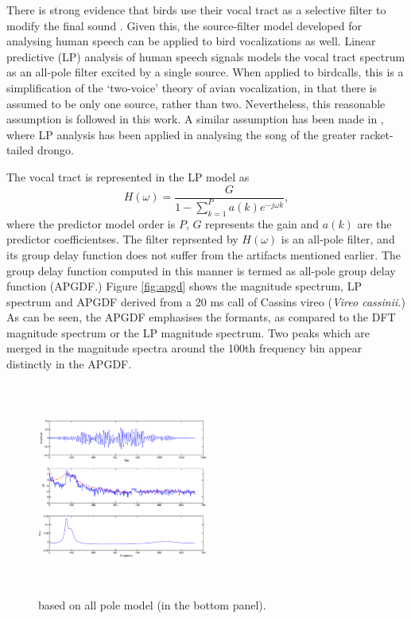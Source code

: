 \documentclass[a4paper]{article}
\begin{document}
There is strong evidence that birds use their vocal tract as a selective filter
to modify the final sound \cite{catchpole}.  Given this, the source-filter model
developed for analysing human speech can be applied to bird vocalizations as
well.  Linear predictive (LP) analysis of human speech signals models the vocal
tract spectrum as an all-pole filter \cite{makhoul} excited by a single source.
When applied to birdcalls, this is a simplification of the `two-voice' theory of
avian vocalization\cite{catchpoole}, in that there is assumed to be only one
source, rather than two. Nevertheless, this reasonable assumption is followed in
this work. A similar assumption has been made in \cite{agnihotri}, where LP
analysis has been applied in analysing the song of the greater racket-tailed
drongo.

The vocal tract is represented in the LP model as
\begin{equation}
H(\omega) = \frac{G}{1-\sum_{k=1}^{P} a(k) e^{-j \omega k}},
\end{equation}
where the predictor model order is $P$, $G$ represents the gain and $a(k)$ are
the predictor coefficientses\cite{makhoul}.
The filter reprsented by $H(\omega)$ is an all-pole filter, and its group delay
function does not suffer from the artifacts mentioned earlier. The group delay
function computed in this manner is termed as all-pole group delay
function (APGDF.) Figure \ref{fig:apgd} shows the magnitude spectrum, LP
spectrum and APGDF derived from a 20 ms call of Cassins vireo (\textit{Vireo
cassinii.}) As can be seen, the APGDF emphasises the formants, as compared to the
DFT magnitude spectrum or the LP magnitude spectrum. Two peaks which are merged
in the magnitude spectra around the 100th frequency bin appear distinctly in the
APGDF.

\begin{figure}[h]
\centering
\includegraphics[width=0.5\textwidth,height=7cm]{apGd.eps}
\caption{based on all pole model (in the bottom panel).}
\label{fig:all-pole}
\end{figure}
\end{document}
